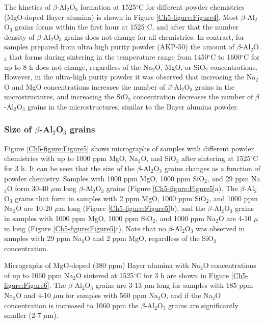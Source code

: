 The kinetics of $\beta$-Al$_{2}$O$_{3}$ formation at 1525$^{\circ}$C for different powder chemistries (MgO-doped Bayer alumina) is shown in Figure \ref{Ch5-figure:Figure4}. Most $\beta$-Al$_{2}$O$_{3}$ grains forms within the first hour at 1525$^{\circ}$C, and after that the number density of $\beta$-Al$_{2}$O$_{3}$ grains does not change for all chemistries. In contrast, for samples prepared from ultra high purity powder (AKP-50) the amount of $\beta$-Al$_{2}$O$_{3}$ that forms during sintering in the temperature range from 1450$^{\circ}$C to 1600$^{\circ}$C for up to 8 h does not change, regardless of the Na$_{2}$O, MgO, or SiO$_{2}$ concentrations. However, in the ultra-high purity powder it was observed that increasing the Na$_{2}$O and MgO concentrations increases the number of $\beta$-Al$_{2}$O$_{3}$ grains in the microstructures, and increasing the SiO$_{2}$ concentration decreases the number of $\beta$-Al$_{2}$O$_{3}$ grains in the microstructures, similar to the Bayer alumina powder.

\subsubsection{Size of $\beta$-Al$_{2}$O$_{3}$ grains}
Figure \ref{Ch5-figure:Figure5} shows micrographs of samples with different powder chemistries with up to 1000 ppm MgO, Na$_{2}$O, and SiO$_{2}$ after sintering at 1525$^{\circ}$C for 3 h. It can be seen that the size of the $\beta$-Al$_{2}$O$_{3}$ grains changes as a function of powder chemistry. Samples with 1000 ppm MgO, 1000 ppm SiO$_{2}$, and 29 ppm Na$_{2}$O form 30-40 $\mu$m long $\beta$-Al$_{2}$O$_{3}$ grains (Figure \ref{Ch5-figure:Figure5}a). The $\beta$-Al$_{2}$O$_{3}$ grains that form in samples with 2 ppm MgO, 1000 ppm SiO$_{2}$, and 1000 ppm Na$_{2}$O are 10-20 $\mu$m long (Figure \ref{Ch5-figure:Figure5}b), and the $\beta$-Al$_{2}$O$_{3}$ grains in samples with 1000 ppm MgO, 1000 ppm SiO$_{2}$, and 1000 ppm Na$_{2}$O are 4-10 $\mu$m long (Figure \ref{Ch5-figure:Figure5}c). Note that no $\beta$-Al$_{2}$O$_{3}$ was observed in samples with 29 ppm Na$_{2}$O and 2 ppm MgO, regardless of the SiO$_{2}$ concentration.

Micrographs of MgO-doped (380 ppm) Bayer alumina with Na$_{2}$O concentrations of up to 1060 ppm Na$_{2}$O sintered at 1525$^{\circ}$C for 3 h are shown in Figure \ref{Ch5-figure:Figure6}. The $\beta$-Al$_{2}$O$_{3}$ grains are 3-13 $\mu$m long for samples with 185 ppm Na$_{2}$O and 4-10 $\mu$m for samples with 560 ppm Na$_{2}$O, and if the Na$_{2}$O concentration is increased to 1060 ppm the $\beta$-Al$_{2}$O$_{3}$ grains are significantly smaller (2-7 $\mu$m).

